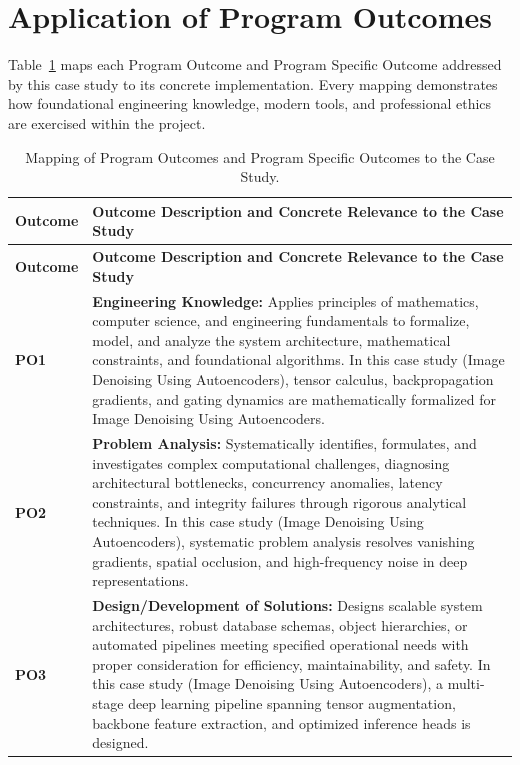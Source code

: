 \section{Application of Program Outcomes}
Table~\ref{tab:po} maps each Program Outcome and Program Specific Outcome addressed by this case study to its concrete implementation. Every mapping demonstrates how foundational engineering knowledge, modern tools, and professional ethics are exercised within the project.

{\small
\begin{longtable}{@{}>{\centering\arraybackslash}p{1.8cm} p{13.2cm}@{}}
    \caption{Mapping of Program Outcomes and Program Specific Outcomes to the Case Study.}\label{tab:po}\\
    \toprule
    \textbf{Outcome} & \textbf{Outcome Description and Concrete Relevance to the Case Study} \\
    \midrule
    \endfirsthead
    \toprule
    \textbf{Outcome} & \textbf{Outcome Description and Concrete Relevance to the Case Study} \\
    \midrule
    \endhead
\textbf{PO1} & \textbf{Engineering Knowledge:} Applies principles of mathematics, computer science, and engineering fundamentals to formalize, model, and analyze the system architecture, mathematical constraints, and foundational algorithms. In this case study (Image Denoising Using Autoencoders), tensor calculus, backpropagation gradients, and gating dynamics are mathematically formalized for Image Denoising Using Autoencoders. \\
    \addlinespace
\textbf{PO2} & \textbf{Problem Analysis:} Systematically identifies, formulates, and investigates complex computational challenges, diagnosing architectural bottlenecks, concurrency anomalies, latency constraints, and integrity failures through rigorous analytical techniques. In this case study (Image Denoising Using Autoencoders), systematic problem analysis resolves vanishing gradients, spatial occlusion, and high-frequency noise in deep representations. \\
    \addlinespace
\textbf{PO3} & \textbf{Design/Development of Solutions:} Designs scalable system architectures, robust database schemas, object hierarchies, or automated pipelines meeting specified operational needs with proper consideration for efficiency, maintainability, and safety. In this case study (Image Denoising Using Autoencoders), a multi-stage deep learning pipeline spanning tensor augmentation, backbone feature extraction, and optimized inference heads is designed. \\

\end{longtable}}
